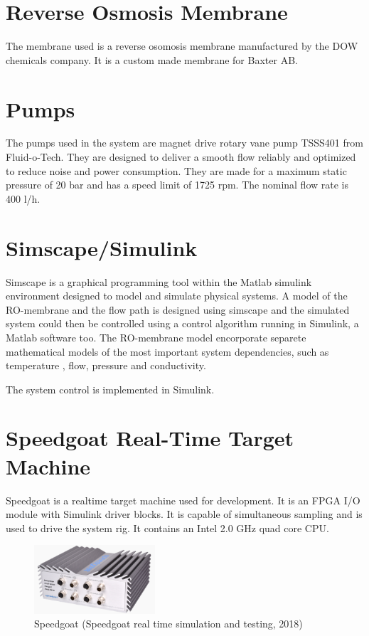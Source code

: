 
\section{Reverse Osmosis Membrane}
The membrane used is a reverse osomosis membrane manufactured by the DOW chemicals company. It is a custom made membrane for Baxter AB. 

\section{Pumps}
The pumps used in the system are magnet drive rotary vane pump TSSS401 from Fluid-o-Tech. They are designed to deliver a smooth flow reliably and optimized to reduce noise and power consumption. They are made for a maximum static pressure of 20 bar and has a speed limit of 1725 rpm. The nominal flow rate is 400 l/h. 

\section{Simscape/Simulink} 
\label{Simscape}

Simscape is a graphical programming tool within the Matlab simulink environment designed to model and simulate physical systems. A model of the RO-membrane and the flow path is designed using simscape and the simulated system could then be controlled using a control algorithm running in Simulink, a Matlab software too. The RO-membrane model encorporate separete mathematical models of the most important system dependencies, such as temperature , flow, pressure and conductivity.  

The system control is implemented in Simulink. 


\section{Speedgoat Real-Time Target Machine}
\label{speedgoat}
Speedgoat is a realtime target machine used for development. It is an FPGA I/O module with Simulink driver blocks. It is capable of simultaneous sampling and is used to drive the system rig. It contains an Intel 2.0 GHz quad core CPU. 

\begin{figure}[h]
    \centering
    \includegraphics[width=0.4\textwidth]{Speedgoat}
    \caption{Speedgoat (Speedgoat real time simulation and testing, 2018)}
    \label{fig:speedgoat}
\end{figure}

